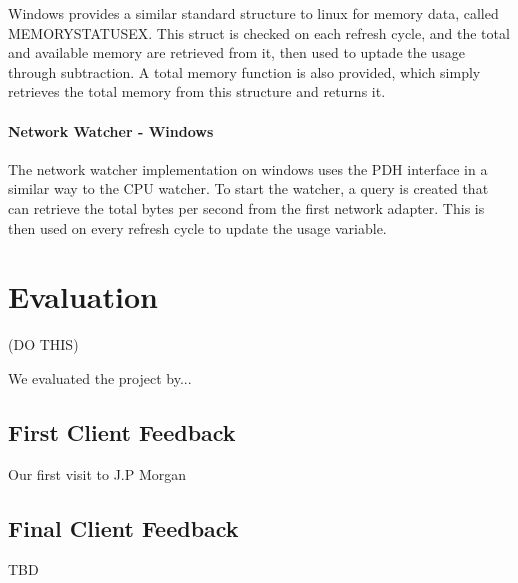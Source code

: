 \documentclass{l3proj}
\begin{document}
Windows provides a similar standard structure to linux for memory data, called MEMORYSTATUSEX. This struct is checked on each refresh cycle, and the total and available memory are retrieved from it, then used to uptade the usage through subtraction. A total memory function is also provided, which simply retrieves the total memory from this structure and returns it.

\subsubsection{Network Watcher - Windows}

The network watcher implementation on windows uses the PDH interface in a similar way to the CPU watcher. To start the watcher, a query is created that can retrieve the total bytes per second from the first network adapter. This is then used on every refresh cycle to update the usage variable.



\chapter{Evaluation}

(DO THIS)

We evaluated the project by...


\section{First Client Feedback}

Our first visit to J.P Morgan

\section{Final Client Feedback}

TBD

\end{document}
